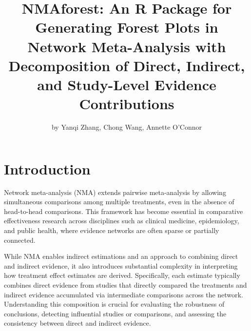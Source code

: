 \title{NMAforest: An R Package for Generating Forest Plots in Network Meta-Analysis with Decomposition of Direct, Indirect, and Study-Level Evidence Contributions}

\author{by Yanqi Zhang, Chong Wang, Annette O'Connor}

\maketitle


\section{Introduction}
Network meta-analysis (NMA)  extends pairwise meta-analysis by allowing simultaneous comparisons among multiple treatments, even in the absence of head-to-head comparisons. This framework has become essential in comparative effectiveness research across disciplines such as clinical medicine, epidemiology, and public health, where evidence networks are often sparse or partially connected.

While NMA enables indirect estimations and an approach to combining direct and indirect evidence, it also introduces substantial complexity in interpreting how treatment effect estimates are derived. Specifically, each estimate typically combines direct evidence from studies that directly compared the treatments and indirect evidence accumulated via intermediate comparisons across the network. Understanding this composition is crucial for evaluating the robustness of conclusions, detecting influential studies or comparisons, and assessing the consistency between direct and indirect evidence.

